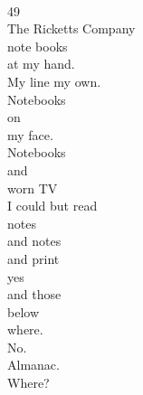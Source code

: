 \documentclass[smalldemyvopaper,11pt,twoside,onecolumn,openright,extrafontsizes]{memoir}
\begin{document}
\\49
\\The Ricketts Company
\\note books
\\at my hand.
\\My line my own.
\\Notebooks
\\on
\\my face.
\\Notebooks
\\and
\\worn TV
\\I could but read
\\notes
\\and notes
\\and print
\\yes
\\and those
\\below
\\where.
\\No.
\\Almanac.
\\Where?
\end{document}
